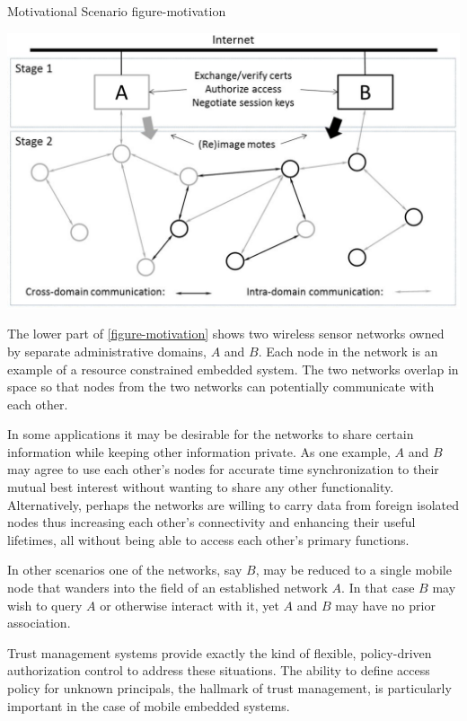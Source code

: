 \begin{fpfig*}[t]
  {Motivational Scenario}
  {figure-motivation}
  \begin{center}
    \includegraphics[scale=.40]{Figures/spartanrpc.eps}
  \end{center}
\end{fpfig*}

The lower part of \autoref{figure-motivation} shows two wireless sensor networks owned by
separate administrative domains, $A$ and $B$. Each node in the network is an example of a
resource constrained embedded system. The two networks overlap in space so that nodes from the
two networks can potentially communicate with each other.

In some applications it may be desirable for the networks to share certain information while
keeping other information private. As one example, $A$ and $B$ may agree to use each other's
nodes for accurate time synchronization to their mutual best interest without wanting to share
any other functionality. Alternatively, perhaps the networks are willing to carry data from
foreign isolated nodes thus increasing each other's connectivity and enhancing their useful
lifetimes, all without being able to access each other's primary functions.

In other scenarios one of the networks, say $B$, may be reduced to a single mobile node that
wanders into the field of an established network $A$. In that case $B$ may wish to query $A$ or
otherwise interact with it, yet $A$ and $B$ may have no prior association.

Trust management systems provide exactly the kind of flexible, policy-driven authorization
control to address these situations. The ability to define access policy for unknown principals,
the hallmark of trust management, is particularly important in the case of mobile embedded
systems.

